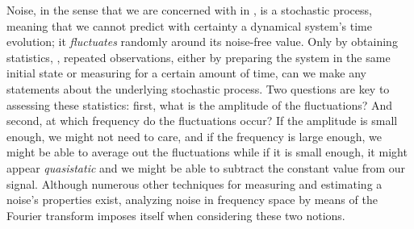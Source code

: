 Noise, in the sense that we are concerned with in \thethesis,
is a stochastic process, meaning that we cannot predict with certainty a dynamical system's time evolution; it \emph{fluctuates} randomly around its noise-free value.
Only by obtaining statistics, \ie, repeated observations, either by preparing the system in the same initial state or measuring for a certain amount of time, can we make any statements about the underlying stochastic process.
Two questions are key to assessing these statistics: first, what is the amplitude of the fluctuations?
And second, at which frequency do the fluctuations occur?
If the amplitude is small enough, we might not need to care, and if the frequency is large enough, we might be able to average out the fluctuations while if it is small enough, it might appear \emph{quasistatic} and we might be able to subtract the constant value from our signal.
Although numerous other techniques for measuring and estimating a noise's properties exist, analyzing noise in frequency space by means of the Fourier transform imposes itself when considering these two notions.


